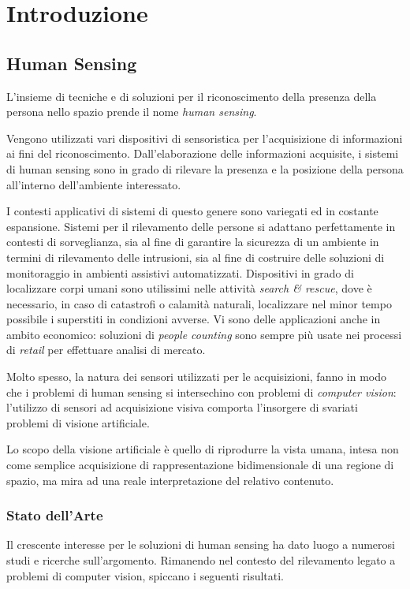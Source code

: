 
\chapter{Introduzione}
\label{chap:introduction}
    \section{Human Sensing}
    \label{sec:human_sensing}
        L'insieme di tecniche e di soluzioni per il riconoscimento della presenza della persona nello spazio prende il nome \emph{human sensing}.

        Vengono utilizzati vari dispositivi di sensoristica per l'acquisizione di informazioni ai fini del riconoscimento. 
        Dall'elaborazione delle informazioni acquisite, i sistemi di human sensing sono in grado di rilevare la presenza e la posizione della persona all'interno dell'ambiente interessato.

        I contesti applicativi di sistemi di questo genere sono variegati ed in costante espansione.
        Sistemi per il rilevamento delle persone si adattano perfettamente in contesti di sorveglianza, sia al fine di garantire la sicurezza di un ambiente in termini di rilevamento delle intrusioni, sia al fine di costruire delle soluzioni di monitoraggio in ambienti assistivi automatizzati.
        Dispositivi in grado di localizzare corpi umani sono utilissimi nelle attività \emph{search \& rescue}, dove è necessario, in caso di catastrofi o calamità naturali, localizzare nel minor tempo possibile i superstiti in condizioni avverse.
        Vi sono delle applicazioni anche in ambito economico: soluzioni di \emph{people counting} sono sempre più usate nei processi di \emph{retail} per effettuare analisi di mercato.

        Molto spesso, la natura dei sensori utilizzati per le acquisizioni, fanno in modo che i problemi di human sensing si intersechino con problemi di \emph{computer vision}: l'utilizzo di sensori ad acquisizione visiva comporta l'insorgere di svariati problemi di visione artificiale.

        Lo scopo della visione artificiale è quello di riprodurre la vista umana, intesa non come semplice acquisizione di rappresentazione bidimensionale di una regione di spazio, ma mira ad una reale interpretazione del relativo contenuto.

        \subsection{Stato dell'Arte}
            Il crescente interesse per le soluzioni di human sensing ha dato luogo a numerosi studi e ricerche sull'argomento.
            Rimanendo nel contesto del rilevamento legato a problemi di computer vision, spiccano i seguenti risultati.

